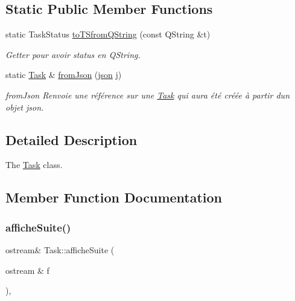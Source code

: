 \subsection*{Static Public Member Functions}
\begin{DoxyCompactItemize}
\item 
\mbox{\label{classTask_af7b1d5478fb4d5f53faa71478bf24d38}} 
static Task\+Status \hyperlink{classTask_af7b1d5478fb4d5f53faa71478bf24d38}{to\+T\+Sfrom\+Q\+String} (const Q\+String \&t)
\begin{DoxyCompactList}\small\item\em Getter pour avoir status en Q\+String. \end{DoxyCompactList}\item 
static \hyperlink{classTask}{Task} \& \hyperlink{classTask_a9b3bf109c5f117a106f2443cba792dd9}{from\+Json} (\hyperlink{classnlohmann_1_1basic__json}{json} j)
\begin{DoxyCompactList}\small\item\em from\+Json Renvoie une référence sur une \hyperlink{classTask}{Task} qui aura été créée à partir d\textquotesingle{}un objet json. \end{DoxyCompactList}\end{DoxyCompactItemize}


\subsection{Detailed Description}
The \hyperlink{classTask}{Task} class. 

\subsection{Member Function Documentation}
\mbox{\label{classTask_aaef115655e5c20b9919da726ae526f8a}} 
\subsubsection{\texorpdfstring{affiche\+Suite()}{afficheSuite()}}
{\footnotesize\ttfamily ostream\& Task\+::affiche\+Suite (\begin{DoxyParamCaption}\item[{ostream \&}]{f }\end{DoxyParamCaption})\hspace{0.3cm}{\ttfamily [inline]}, {\ttfamily [virtual]}}



